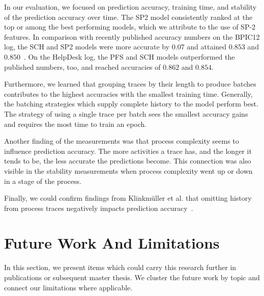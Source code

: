 In our evaluation, we focused on prediction accuracy, training time, and stability of the prediction accuracy over time.
The SP2 model consistently ranked at the top or among the best performing models, which we attribute to the use of SP-2 features. In comparison with recently published accuracy numbers on the BPIC12 log, the SCH and SP2 models were more accurate by $0.07$ and attained $0.853$ and $0.850$~\cite{boehmer2018probability, evermann2016}.
On the HelpDesk log, the PFS and SCH models outperformed the published numbers, too, and reached accuracies of $0.862$ and $0.854$.

Furthermore, we learned that grouping traces by their length to produce batches contributes to the highest accuracies with the smallest training time.
Generally, the batching strategies which supply complete history to the model perform best.
The strategy of using a single trace per batch sees the smallest accuracy gains and requires the most time to train an epoch.

Another finding of the measurements was that process complexity seems to influence prediction accuracy.
The more activities a trace has, and the longer it tends to be, the less accurate the predictions become.
This connection was also visible in the stability measurements when process complexity went up or down in a stage of the process.

Finally, we could confirm findings from Klinkmüller et al. that omitting history from process traces negatively impacts prediction accuracy~\cite{klinkmuller2018reliablemonitoring}.

\section{Future Work And Limitations}\label{sec:conclusion:future-work}
In this section, we present items which could carry this research further in publications or subsequent master thesis.
We cluster the future work by topic and connect our limitations where applicable.

